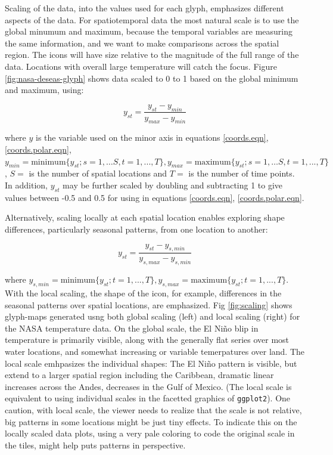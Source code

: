 \documentclass[oneside]{article}
\begin{document}
Scaling of the data, into the values used for each glyph, emphasizes different aspects of the data. For spatiotemporal data the most natural scale is to use the global minumum and maximum, because the temporal variables are measuring the same information, and we want to make comparisons across the spatial region. The icons will have size relative to the magnitude of the full range of the data. Locations with overall large temperature will catch the focus. Figure \ref{fig:nasa-deseas-glyph} shows data scaled to 0 to 1 based on the global minimum and maximum, using:

\begin{equation}
y_{st} = \frac{y_{st}-y_{min}}{y_{max}-y_{min}} %
\label{scale1}
\end{equation}

\noindent where $y$ is the variable used on the minor axis in equations \ref{coords.eqn}, \ref{coords.polar.eqn}, $y_{min} = \mbox{minimum}\{y_{st}; s=1, \dots S, t=1, ..., T \}, y_{max} = \mbox{maximum}\{y_{st}; s=1, \dots S, t=1, ..., T\}$, $S=$ is the number of spatial locations and $T=$ is the number of time points. In addition, $y_{st}$ may be further scaled by doubling and subtracting 1 to give values between -0.5 and 0.5 for using in equations \ref{coords.eqn}, \ref{coords.polar.eqn}.

Alternatively, scaling locally at each spatial location enables exploring shape differences, particularly seasonal patterns, from one location to another:

\begin{equation}
y_{st} = \frac{y_{st}-y_{s,min}}{y_{s,max}-y_{s,min}} %
\label{scale2}
\end{equation}

\noindent where $y_{s, min} = \mbox{minimum}\{y_{st}; t=1, ..., T \}, y_{s,max} = \mbox{maximum}\{y_{st}; t=1, ..., T\}$. With the local scaling, the shape of the icon, for example, differences in the seasonal patterns over spatial locations, are emphasized.  Fig \ref{fig:scaling} shows glyph-maps generated usng both global scaling (left) and local scaling (right) for the NASA temperature data. On the global scale, the El Ni\~no blip in temperature is primarily visible, along with the generally flat series over most water locations, and somewhat increasing or variable temerpatures over land. The local scale emhpasizes the individual shapes: The El Ni\~no pattern is visible, but extend to a larger spatial region including the Caribbean, dramatic linear increases across the Andes, decreases in the Gulf of Mexico. (The local scale is equivalent to using individual scales in the facetted graphics of \texttt{ggplot2}). One caution, with local scale, the viewer needs to realize that the scale is not relative, big patterns in some locations might be just tiny effects. To indicate this on the locally scaled data plots, using a very pale coloring to code the original scale in the tiles, might help puts patterns in perspective.
\end{document}
